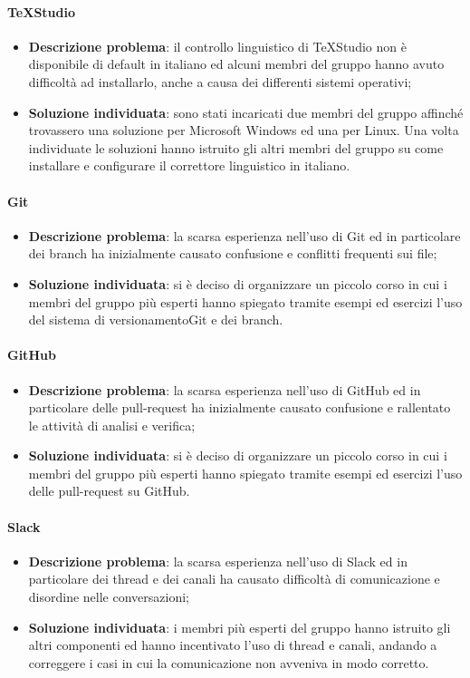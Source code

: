 		\paragraph{TeXStudio}
			\begin{itemize}
				\item \textbf{Descrizione problema}: il controllo linguistico di TeXStudio non è disponibile di default in italiano ed alcuni membri del gruppo hanno avuto difficoltà ad installarlo, anche a causa dei differenti sistemi operativi;
				\item \textbf{Soluzione individuata}: sono stati incaricati due membri del gruppo affinché trovassero una soluzione per Microsoft Windows ed una per Linux. Una volta individuate le soluzioni hanno istruito gli altri membri del gruppo su come installare e configurare il correttore linguistico in italiano.
			\end{itemize}
		\paragraph{Git}
			\begin{itemize}
				\item \textbf{Descrizione problema}: la scarsa esperienza nell'uso di Git ed in particolare dei branch ha inizialmente causato confusione e conflitti frequenti sui file;
				\item \textbf{Soluzione individuata}: si è deciso di organizzare un piccolo corso in cui i membri del gruppo più esperti hanno spiegato tramite esempi ed esercizi l'uso del sistema di versionamento\glosp Git e dei branch. 
			\end{itemize}
		\paragraph{GitHub}
			\begin{itemize}
			\item \textbf{Descrizione problema}: la scarsa esperienza nell'uso di GitHub ed in particolare delle pull-request ha inizialmente causato confusione e rallentato le attività di analisi e verifica;
			\item \textbf{Soluzione individuata}: si è deciso di organizzare un piccolo corso in cui i membri del gruppo più esperti hanno spiegato tramite esempi ed esercizi l'uso delle pull-request su GitHub. 
			\end{itemize}
		\paragraph{Slack}
			\begin{itemize}
				\item \textbf{Descrizione problema}: la scarsa esperienza nell'uso di Slack ed in particolare dei thread e dei canali ha causato difficoltà di comunicazione e disordine nelle conversazioni;
				\item \textbf{Soluzione individuata}: i membri più esperti del gruppo hanno istruito gli altri componenti ed hanno incentivato l'uso di thread e canali, andando a correggere i casi in cui la comunicazione non avveniva in modo corretto. 
			\end{itemize}
